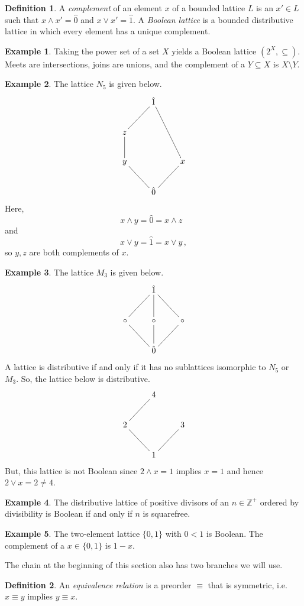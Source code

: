 \documentclass[12pt]{article}
\theoremstyle{definition}
\newtheorem*{example}{\color{teal} Example}
\newtheorem*{definition}{\color{OliveGreen} Definition}
\begin{document}
\begin{multicols*}{2}
\begin{definition}
	A \emph{complement} of an element $x$ of a bounded lattice $L$ is an $x'\in L$ such that $x\land x' = \hat0$ and $x\lor x' = \hat1$. A \emph{Boolean lattice} is a bounded distributive lattice in which every element has a unique complement.
\end{definition}
\begin{example}
	Taking the power set of a set $X$ yields a Boolean lattice $(2^X, \subseteq)$. Meets are intersections, joins are unions, and the complement of a $Y\subseteq X$ is $X\setminus Y$.
\end{example}
\begin{example}
	The lattice $N_5$ is given below.
	\[\xymatrix{
		& \hat1 & \\
		z\ar@{-}[ur] && \\
		y\ar@{-}[u] && x\ar@{-}[uul] \\
		& \hat0\ar@{-}[ul]\ar@{-}[ur] &
	}\]
 	Here,
 	\[
 		x\land y = \hat0 = x\land z\phantom{\,,}
 	\]
 	and
 	\[
 		x\lor y = \hat1 = x\lor y\,,
 	\]
 	so $y,z$ are both complements of $x$.
\end{example}
\begin{example}
	The lattice $M_3$ is given below.
	\[\xymatrix{
		& \hat1 & \\
		\circ\ar@{-}[ur] & \circ\ar@{-}[u] & \circ\ar@{-}[ul] \\
		& \hat0\ar@{-}[ul]\ar@{-}[u]\ar@{-}[ur] &
	}\]
	A lattice is distributive if and only if it has no sublattices isomorphic to $N_5$ or $M_3$. So, the lattice below is distributive.
	\[\xymatrix{
		& 4 & \\
		2\ar@{-}[ur] && 3 \\
		& 1\ar@{-}[ul]\ar@{-}[ur] &
	}\]
	But, this lattice is not Boolean since $2\land x = 1$ implies $x=1$ and hence $2\lor x = 2 \neq 4$.
\end{example}
\begin{example}
	The distributive lattice of positive divisors of an $n\in\mathbb{Z}^+$ ordered by divisibility is Boolean if and only if $n$ is squarefree.
\end{example}
\begin{example}
	The two-element lattice $\{0,1\}$ with $0<1$ is Boolean. The complement of a $x\in\{0,1\}$ is $1-x$.
\end{example}

The chain at the beginning of this section also has two branches we will use.

\begin{definition}
	An \emph{equivalence relation} is a preorder $\equiv$ that is symmetric, i.e. $x\equiv y$ implies $y\equiv x$.


\end{definition}
\end{multicols*}
\end{document}
